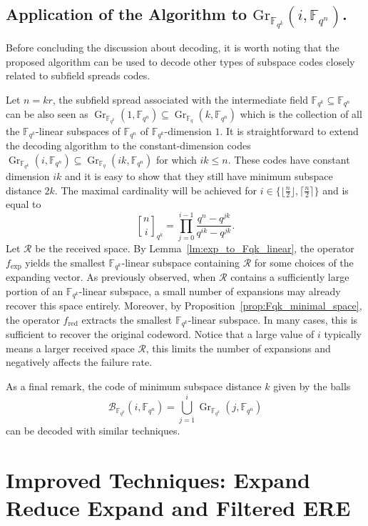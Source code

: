 \documentclass{article}
\newcommand{\Fq}{\mathbb{F}_{q}}
\newcommand{\Fqn}{\mathbb{F}_{q^n}}
\newcommand{\Fqk}{\mathbb{F}_{q^k}}
\newcommand{\calB}{\mathcal{B}}
\newcommand{\calR}{\mathcal{R}}
\newcommand{\fred}{f_{\mathrm{red}}}
\newcommand{\fexp}{f_{\mathrm{exp}}}
\newcommand{\gbinom}[2]{\genfrac{[}{]}{0pt}{}{#1}{#2}}
\DeclareMathOperator{\Gr}{Gr}
\begin{document}
\subsection{Application of the Algorithm to $\mathrm{Gr}_{\Fqk}(i,\Fqn)$.}
Before concluding the discussion about decoding, it is worth noting that the proposed algorithm can be used to decode other types of subspace codes closely related to subfield spreads codes. 
\par Let $n=kr$, the subfield spread associated with the intermediate field $\Fqk \subseteq \Fqn$ can be also seen as $\Gr_{\Fqk}(1,\Fqn) \subseteq \Gr_{\Fq}(k,\Fqn) $ which is the collection of all the $\Fqk$-linear subspaces of $\Fqn$ of $\Fqk$-dimension $1$.
It is straightforward to extend the decoding algorithm to the constant-dimension codes $\Gr_{\Fqk}(i,\Fqn) \subseteq \Gr_{\Fq}(ik,\Fqn)$ for which $ik \leq n.$
These codes have constant dimension $ik$ and it is easy to show that they still have minimum subspace distance $2k$.
The maximal cardinality will be achieved for $i\in\{\lfloor\frac{n}{2}\rfloor, \lceil\frac{n}{2}\rceil\}$ and is equal to 
\[
\gbinom{n}{i}_{q^k} = \prod_{j=0}^{i-1} \frac{q^n - q^{jk}}{q^{ik}-q^{jk}}.
\]
Let $\calR$ be the received space. By Lemma~\ref{lm:exp_to_Fqk_linear}, the operator $\fexp$ yields the smallest $\Fqk$-linear subspace containing $\calR$ for some choices of the expanding vector.
As previously observed, when $\calR$ contains a sufficiently large portion of an $\Fqk$-linear subspace, a small number of expansions may already recover this space entirely.
Moreover, by Proposition~\ref{prop:Fqk_minimal_space}, the operator $\fred$ extracts the smallest $\Fqk$-linear subspace. In many cases, this is sufficient to recover the original codeword. Notice that a large value of $i$ typically means a larger received space $\calR$, this limits the number of expansions and negatively affects the failure rate.

As a final remark, the code of minimum subspace distance $k$ given by the balls 
\[
\calB_{\Fqk}(i,\Fqn) = \bigcup_{j=1}^i \Gr_{\Fqk}(j, \Fqn)
\] 
can be decoded with similar techniques.
\section{Improved Techniques: Expand Reduce Expand and Filtered ERE}
\label{sec: Improved techniques: Expand Reduce Expand and Filtered ERE}
\end{document}
